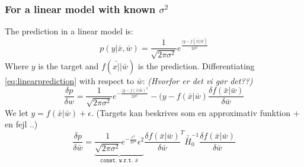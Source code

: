 \documentclass[11pt, a4paper]{article} %
\begin{document}
\subsubsection{For a linear model with known $\sigma^2$}
The prediction in a linear model is:
\begin{equation}
p(y|\bar{x},\bar{w}) = \frac{1}{\sqrt{2 \pi \sigma^2}} e^{\frac{(y-f(\bar{x|}|\bar{w})}{2 \sigma^2}} \label{linearprediction}
\end{equation}
Where $y$ is the target and $f(\bar{x|}|\bar{w})$ is the prediction. Differentiating \eqref{eq:linearprediction} with respect to $\bar{w}$: \emph{(Hvorfor er det vi gør det??)}
\begin{equation}
\frac{\delta p}{\delta w} = \frac{1}{\sqrt{2 \pi \sigma^2}} e^{-\frac{(y-f(\bar{x}|\bar{w})^2}{2\sigma^2}}-(y-f(\bar{x}|\bar{w}) \frac{\delta f(\bar{x}|\bar{w})}{\delta \bar{w}}
\end{equation}
We let $y = f(\bar{x}|\bar{w})+ \epsilon$. (Targets kan beskrives som en approximativ funktion + en fejl ..)
\begin{equation}
\frac{\delta p}{\delta \bar{w}} = \underbrace{ 
\frac{1}{\sqrt{2\pi \sigma^2}}
e^{-\frac{\epsilon^2}{2 \sigma^2}}\epsilon^2
}_{\texttt{const. w.r.t. } \bar{x} 
} 
\frac{\delta f(\bar{x}|\bar{w})}{\delta \bar{w}}^T \bar{\bar{H}}_0^{-1} \frac{\delta f(\bar{x}|\bar{w})}{\delta \bar{w}}
\end{equation}

\newpage

\end{document}
